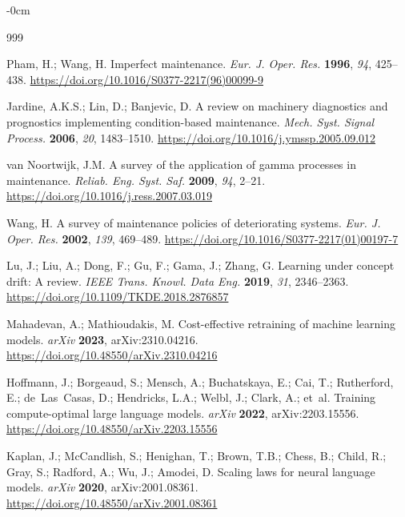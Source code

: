 \documentclass[electronics,article,submit,pdftex,moreauthors]{Definitions/mdpi}
\begin{document}
\begin{adjustwidth}{-\extralength}{0cm}


\begin{thebibliography}{999}

Pham, H.; Wang, H. Imperfect maintenance. {\em Eur. J. Oper. Res.} {\bf 1996}, {\em 94}, 425--438. \url{https://doi.org/10.1016/S0377-2217(96)00099-9}

Jardine, A.K.S.; Lin, D.; Banjevic, D. A review on machinery diagnostics and prognostics implementing condition-based maintenance. {\em Mech. Syst. Signal Process.} {\bf 2006}, {\em 20}, 1483--1510. \url{https://doi.org/10.1016/j.ymssp.2005.09.012}

van Noortwijk, J.M. A survey of the application of gamma processes in maintenance. {\em Reliab. Eng. Syst. Saf.} {\bf 2009}, {\em 94}, 2--21. \url{https://doi.org/10.1016/j.ress.2007.03.019}

Wang, H. A survey of maintenance policies of deteriorating systems. {\em Eur. J. Oper. Res.} {\bf 2002}, {\em 139}, 469--489. \url{https://doi.org/10.1016/S0377-2217(01)00197-7}

Lu, J.; Liu, A.; Dong, F.; Gu, F.; Gama, J.; Zhang, G. Learning under concept drift: A review. {\em IEEE Trans. Knowl. Data Eng.} {\bf 2019}, {\em 31}, 2346--2363. \url{https://doi.org/10.1109/TKDE.2018.2876857}

Mahadevan, A.; Mathioudakis, M. Cost-effective retraining of machine learning models. {\em arXiv} {\bf 2023}, arXiv:2310.04216. \url{https://doi.org/10.48550/arXiv.2310.04216}

Hoffmann, J.; Borgeaud, S.; Mensch, A.; Buchatskaya, E.; Cai, T.; Rutherford, E.; de~Las~Casas, D.; Hendricks, L.A.; Welbl, J.; Clark, A.; et~al. Training compute-optimal large language models. {\em arXiv} {\bf 2022}, arXiv:2203.15556. \url{https://doi.org/10.48550/arXiv.2203.15556}

Kaplan, J.; McCandlish, S.; Henighan, T.; Brown, T.B.; Chess, B.; Child, R.; Gray, S.; Radford, A.; Wu, J.; Amodei, D. Scaling laws for neural language models. {\em arXiv} {\bf 2020}, arXiv:2001.08361. \url{https://doi.org/10.48550/arXiv.2001.08361}


\end{thebibliography}
\end{adjustwidth}
\end{document}
